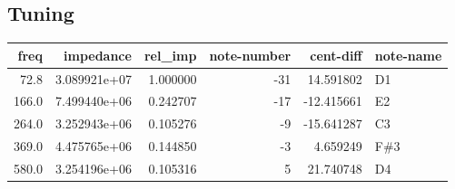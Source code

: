 \documentclass{article}
\begin{document}
\subsection{Tuning}
\begin{centering}
\begin{tabular}{rrrrrl}
\toprule
 freq &    impedance &  rel\_imp &  note-number &  cent-diff & note-name \\
\midrule
 72.8 & 3.089921e+07 & 1.000000 &          -31 &  14.591802 &        D1 \\
166.0 & 7.499440e+06 & 0.242707 &          -17 & -12.415661 &        E2 \\
264.0 & 3.252943e+06 & 0.105276 &           -9 & -15.641287 &        C3 \\
369.0 & 4.475765e+06 & 0.144850 &           -3 &   4.659249 &       F\#3 \\
580.0 & 3.254196e+06 & 0.105316 &            5 &  21.740748 &        D4 \\
\bottomrule
\end{tabular}
\end{centering}
\end{document}

